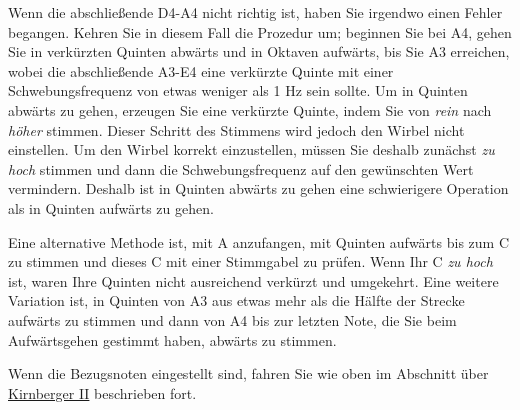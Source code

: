 Wenn die abschließende D4-A4 nicht richtig ist, haben Sie irgendwo einen Fehler begangen.
Kehren Sie in diesem Fall die Prozedur um; beginnen Sie bei A4, gehen Sie in verkürzten Quinten abwärts und in Oktaven aufwärts, bis Sie A3 erreichen, wobei die abschließende A3-E4 eine verkürzte Quinte mit einer Schwebungsfrequenz von etwas weniger als 1 Hz sein sollte.
Um in Quinten abwärts zu gehen, erzeugen Sie eine verkürzte Quinte, indem Sie von \textit{rein} nach \textit{höher} stimmen.
Dieser Schritt des Stimmens wird jedoch den Wirbel nicht einstellen.
Um den Wirbel korrekt einzustellen, müssen Sie deshalb zunächst \textit{zu hoch} stimmen und dann die Schwebungsfrequenz auf den gewünschten Wert vermindern.
Deshalb ist in Quinten abwärts zu gehen eine schwierigere Operation als in Quinten aufwärts zu gehen.

Eine alternative Methode ist, mit A anzufangen, mit Quinten aufwärts bis zum C zu stimmen und dieses C mit einer Stimmgabel zu prüfen.
Wenn Ihr C \textit{zu hoch} ist, waren Ihre Quinten nicht ausreichend verkürzt und umgekehrt.
Eine weitere Variation ist, in Quinten von A3 aus etwas mehr als die Hälfte der Strecke aufwärts zu stimmen und dann von A4 bis zur letzten Note, die Sie beim Aufwärtsgehen gestimmt haben, abwärts zu stimmen.

Wenn die Bezugsnoten eingestellt sind, fahren Sie wie oben im Abschnitt über \hyperref[c2_6_kirn2]{Kirnberger II} beschrieben fort.



